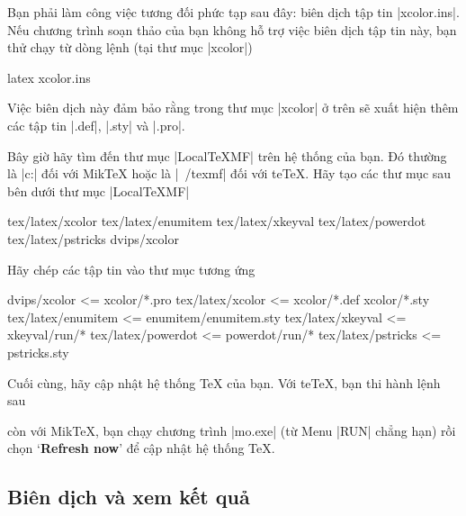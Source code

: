 Bạn phải làm công việc tương đối phức tạp sau đây: biên dịch 
tập tin |xcolor.ins|. Nếu chương trình soạn thảo của bạn không
hỗ trợ  việc biên dịch tập tin này, bạn thử chạy từ dòng lệnh
(tại thư mục |xcolor|)
\begin{example}
  latex xcolor.ins
\end{example}
Việc biên dịch này đảm bảo rằng trong thư mục |xcolor| ở trên
sẽ xuất hiện thêm các tập tin |.def|, |.sty| và |.pro|.

Bây giờ hãy tìm đến thư mục |LocalTeXMF| trên hệ thống của bạn.
Đó thường là |c:\localtexmf| đối với Mik\TeX{} hoặc là |~/texmf|
đối với te\TeX. Hãy tạo các thư mục sau bên dưới thư mục |LocalTeXMF|
\begin{example}
  tex/latex/xcolor
  tex/latex/enumitem
  tex/latex/xkeyval
  tex/latex/powerdot
  tex/latex/pstricks
  dvips/xcolor
\end{example}
Hãy chép các tập tin vào thư mục tương ứng
\begin{example}
  dvips/xcolor        <= xcolor/*.pro
  tex/latex/xcolor    <= xcolor/*.def xcolor/*.sty
  tex/latex/enumitem  <= enumitem/enumitem.sty
  tex/latex/xkeyval   <= xkeyval/run/*
  tex/latex/powerdot  <= powerdot/run/*
  tex/latex/pstricks  <= pstricks.sty
\end{example}
Cuối cùng, hãy cập nhật hệ thống \TeX{} của bạn.
Với te\TeX{}, bạn thi hành lệnh sau
còn với Mik\TeX{}, bạn chạy chương trình |mo.exe| (từ Menu |RUN|
chẳng hạn) rồi chọn `\textbf{Refresh now}' để cập nhật hệ thống \TeX.


\subsection{\texorpdfstring{Biên dịch và xem kết quả}{Bien dich va xem ket qua}}
\label{sec:creation}

